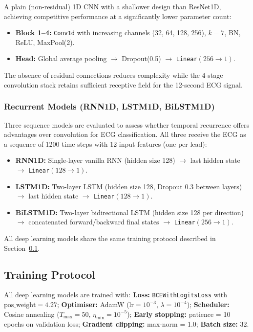 \documentclass[journal, 10pt, twoside]{IEEEtran}
\begin{document}
A plain (non-residual) 1D CNN with a shallower design than ResNet1D,
achieving competitive performance at a significantly lower parameter count:

\begin{itemize}
  \item \textbf{Block 1--4:} \texttt{Conv1d} with increasing channels
        (32, 64, 128, 256), $k=7$, BN, ReLU, MaxPool(2).
  \item \textbf{Head:} Global average pooling $\to$ Dropout(0.5) $\to$
        \texttt{Linear}$(256 \to 1)$.
\end{itemize}

The absence of residual connections reduces complexity while the
4-stage convolution stack retains sufficient receptive field for
the 12-second ECG signal.

\subsubsection{Recurrent Models (RNN1D, LSTM1D, BiLSTM1D)}

Three sequence models are evaluated to assess whether temporal
recurrence offers advantages over convolution for ECG classification.
All three receive the ECG as a sequence of 1200 time steps with 12
input features (one per lead):

\begin{itemize}
  \item \textbf{RNN1D:} Single-layer vanilla RNN (hidden size 128)
        $\to$ last hidden state $\to$ \texttt{Linear}$(128 \to 1)$.
  \item \textbf{LSTM1D:} Two-layer LSTM (hidden size 128, Dropout 0.3
        between layers) $\to$ last hidden state
        $\to$ \texttt{Linear}$(128 \to 1)$.
  \item \textbf{BiLSTM1D:} Two-layer bidirectional LSTM (hidden size 128
        per direction) $\to$ concatenated forward/backward final states
        $\to$ \texttt{Linear}$(256 \to 1)$.
\end{itemize}

All deep learning models share the same training protocol
described in Section~\ref{sec:training}.

\subsection{Training Protocol}
\label{sec:training}

All deep learning models are trained with:
\textbf{Loss:} \texttt{BCEWithLogitsLoss} with
$\text{pos\_weight} = 4.27$;
\textbf{Optimiser:} AdamW
($\text{lr} = 10^{-3}$, $\lambda = 10^{-4}$);
\textbf{Scheduler:} Cosine annealing
($T_\text{max} = 50$, $\eta_\text{min} = 10^{-5}$);
\textbf{Early stopping:} patience = 10 epochs on validation loss;
\textbf{Gradient clipping:} max-norm = 1.0;
\textbf{Batch size:} 32.
\end{document}
